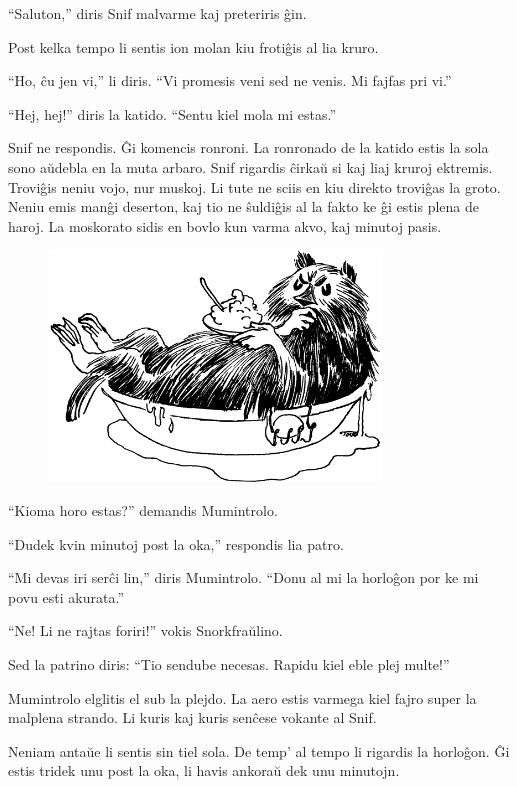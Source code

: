``Saluton,'' diris Snif malvarme kaj preteriris ĝin.

Post kelka tempo li sentis ion molan kiu frotiĝis al lia kruro.

``Ho, ĉu jen vi,'' li diris. ``Vi promesis veni sed ne venis. Mi fajfas pri vi.''

``Hej, hej!'' diris la katido. ``Sentu kiel mola mi estas.''

Snif ne respondis. Ĝi komencis ronroni. La ronronado de la katido estis la sola sono aŭdebla en la muta arbaro. Snif rigardis ĉirkaŭ si kaj liaj kruroj ektremis. Troviĝis neniu vojo, nur muskoj. Li tute ne sciis en kiu direkto troviĝas la groto.
\sectionbreak
Neniu emis manĝi deserton, kaj tio ne ŝuldiĝis al la fakto ke ĝi estis plena de haroj. La moskorato sidis en bovlo kun varma akvo, kaj minutoj pasis.

\begin{figure}[htbp]
\centering
\includegraphics[width=250pt,height=174pt]{9-8.png}
\caption{}
\label{9-8}
\end{figure}

``Kioma horo estas?'' demandis Mumintrolo.

``Dudek kvin minutoj post la oka,'' respondis lia patro.

``Mi devas iri serĉi lin,'' diris Mumintrolo. ``Donu al mi la horloĝon por ke mi povu esti akurata.''

``Ne! Li ne rajtas foriri!'' vokis Snorkfraŭlino.

Sed la patrino diris: ``Tio sendube necesas. Rapidu kiel eble plej multe!''

Mumintrolo elglitis el sub la plejdo. La aero estis varmega kiel fajro super la malplena strando. Li kuris kaj kuris senĉese vokante al Snif.

Neniam antaŭe li sentis sin tiel sola. De temp' al tempo li rigardis la horloĝon. Ĝi estis tridek unu post la oka, li havis ankoraŭ dek unu minutojn.

